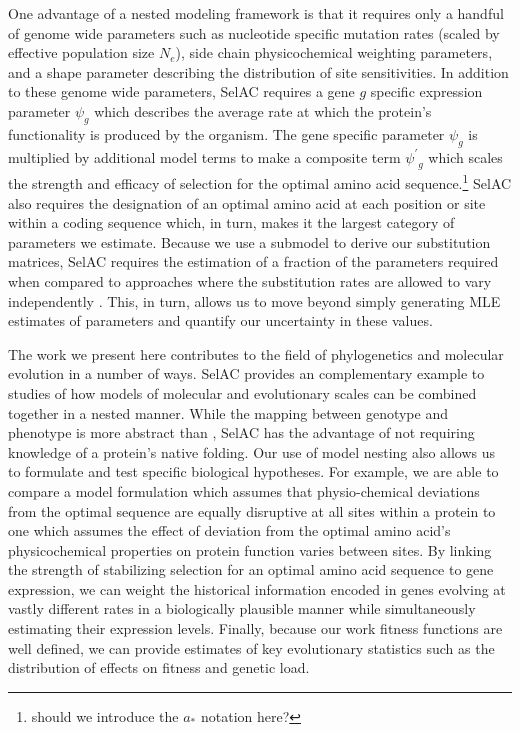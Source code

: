 \documentclass{article}
\newcommand{\Ne}{\ensuremath{{N_e}}\xspace} %
\newcommand{\selac}{SelAC\xspace}
\newcommand{\aopt}{\ensuremath{a_*}\xspace}
\newcommand{\psiprime}{\ensuremath{\psi^\prime}\xspace}
\begin{document}
One advantage of a nested modeling framework is that it requires only a handful of genome wide parameters such as nucleotide specific mutation rates (scaled by effective population size \Ne), side chain physicochemical weighting parameters, and a shape parameter describing the distribution of site sensitivities. %
In addition to these genome wide parameters, \selac requires a gene $g$ specific expression parameter $\psi_g$ which describes the average rate at which the protein's functionality is produced by the organism.
The gene specific parameter $\psi_g$ is multiplied by additional model terms to make a composite term $\psiprime_g$ which scales the strength and efficacy of selection for the optimal amino acid sequence.\footnote{should we introduce the \aopt notation here?}
\selac also requires the designation of an optimal amino acid at each position or site within a coding sequence which, in turn, makes it the largest category of parameters we estimate.
Because we use a submodel to derive our substitution matrices, \selac requires the estimation of a fraction of the parameters required when compared to approaches where the substitution rates are allowed to vary independently \citep{HalpernAndBruno1998,LartillotAndPhilippe2004,RodrigueAndLartillot2014}.
This, in turn, allows us to move beyond simply generating MLE estimates of parameters \citep[c.f.][]{YangAndNielsen2008} and quantify our uncertainty in these values.

The work we present here contributes to the field of phylogenetics and molecular evolution in a number of ways.
\selac provides an complementary example to \citet{ThorneEtAl2012} studies of how models of molecular and evolutionary scales can be combined together in a nested manner.
While the mapping between genotype and phenotype is more abstract than \citet{ThorneEtAl2012}, \selac has the advantage of not requiring knowledge of a protein's native folding.
Our use of model nesting also allows us to formulate and test specific biological hypotheses.
For example, we are able to compare a model formulation which assumes that physio-chemical deviations from the optimal sequence are equally disruptive at all sites within a protein to one which assumes the effect of deviation from the optimal amino acid's physicochemical properties on protein function varies between sites.
By linking the strength of stabilizing selection for an optimal amino acid sequence to gene expression,  we can weight the historical information encoded in genes evolving at vastly different rates in a biologically plausible manner while simultaneously estimating their expression levels.
Finally, because our work fitness functions are well defined, we can provide estimates of key evolutionary statistics such as the distribution of effects on fitness and genetic load.
\end{document}
